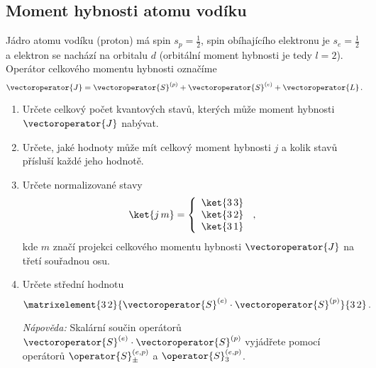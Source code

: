 \subsection{Moment hybnosti atomu vodíku}
	Jádro atomu vodíku (proton) má spin $s_{p}=\frac{1}{2}$, 
	spin obíhajícího elektronu je $s_{e}=\frac{1}{2}$ a elektron se nachází na orbitalu $d$
	(orbitální moment hybnosti je tedy $l=2$).
	Operátor celkového momentu hybnosti označíme
	\begin{equation}
		\vectoroperator{J}=\vectoroperator{S}^{(p)}+\vectoroperator{S}^{(e)}+\vectoroperator{L}\,.
	\end{equation}
	
	\begin{enumerate}
	\item
		Určete celkový počet kvantových stavů, kterých může moment hybnosti $\vectoroperator{J}$ nabývat.
		
	\item
		Určete, jaké hodnoty může mít celkový moment hybnosti $j$ 
		a kolik stavů přísluší každé jeho hodnotě.
		
	\item
		Určete normalizované stavy
		\begin{equation}
			\ket{j\,m}=\left\{\begin{array}{l} \ket{3\,3} \\ \ket{3\,2} \\ \ket{3\,1} \end{array}\right.\,,
		\end{equation}
		kde $m$ značí projekci celkového momentu hybnosti $\vectoroperator{J}$ na třetí souřadnou osu.
		
	\item
		Určete střední hodnotu
		\begin{equation}
			\matrixelement{3\,2}{\vectoroperator{S}^{(e)}\cdot\vectoroperator{S}^{(p)}}{3\,2}\,.
		\end{equation}

\emph{Nápověda:}
	Skalární součin operátorů $\vectoroperator{S}^{(e)}\cdot\vectoroperator{S}^{(p)}$ vyjádřete pomocí
	operátorů	$\operator{S}^{(e,p)}_{\pm}$ a $\operator{S}_{3}^{(e,p)}$.	
	\end{enumerate}
    
